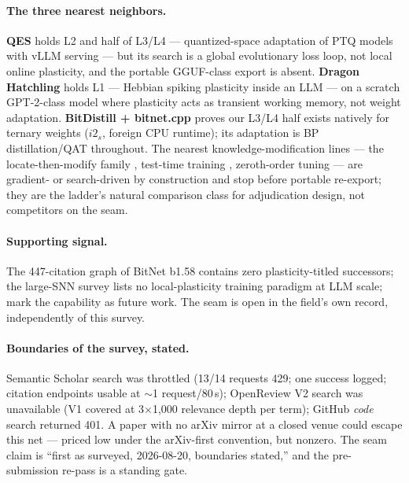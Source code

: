 \paragraph{The three nearest neighbors.}
\textbf{QES} \citep{qes} holds L2 and half of L3/L4 --- quantized-space
adaptation of PTQ models with vLLM serving --- but its search is a
global evolutionary loss loop, not local online plasticity, and the
portable GGUF-class export is absent. \textbf{Dragon Hatchling}
\citep{dragonhatchling} holds L1 --- Hebbian spiking plasticity inside
an LLM --- on a scratch GPT-2-class model where plasticity acts as
transient working memory, not weight adaptation. \textbf{BitDistill +
bitnet.cpp} \citep{bitdistill,bitnnetcpp} proves our L3/L4 half
exists natively for ternary weights ($i2_s$, foreign CPU runtime);
its adaptation is BP distillation/QAT throughout. The nearest
knowledge-modification lines --- the locate-then-modify family
\citep{alphaedit}, test-time training \citep{inplacettt}, zeroth-order
tuning \citep{mezocluster} --- are gradient- or search-driven by
construction and stop before portable re-export; they are the ladder's
natural comparison class for adjudication design, not competitors on
the seam.

\paragraph{Supporting signal.}
The 447-citation graph of BitNet b1.58 \citep{bitnet158} contains
zero plasticity-titled successors; the large-SNN survey
\citep{surveylargesnn} lists no local-plasticity training paradigm at
LLM scale; \citet{rajendran2023future} mark the capability as future
work. The seam is open in the field's own record, independently of
this survey.

\paragraph{Boundaries of the survey, stated.}
Semantic Scholar search was throttled (13/14 requests 429; one
success logged; citation endpoints usable at $\sim$1
request/80\,s); OpenReview V2 search was unavailable (V1 covered at
3$\times$1{,}000 relevance depth per term); GitHub \emph{code}
search returned 401. A paper with no arXiv mirror at a closed venue
could escape this net --- priced low under the arXiv-first
convention, but nonzero. The seam claim is ``first as surveyed,
2026-08-20, boundaries stated,'' and the pre-submission re-pass is a
standing gate.

